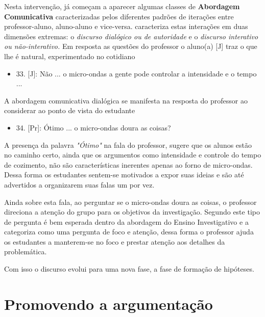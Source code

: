 Nesta intervenção, já começam a aparecer algumas classes de \textbf{Abordagem Comunicativa} caracterizadas pelos diferentes padrões de iterações entre professor-aluno, aluno-aluno e vice-versa. \cite{MORTIMER:2002} caracteriza estas interações em duas dimensões extremas: o \emph{discurso dialógico ou de autoridade} e o \emph{discurso interativo ou não-interativo.}
Em resposta as questões do professor o aluno(a) [J] traz o que lhe é natural, experimentado no cotidiano
\begin{itemize}
    \item 33. [J]: Não ... o micro-ondas a gente pode controlar a intensidade e o tempo ...
\end{itemize}
A abordagem comunicativa dialógica se manifesta na resposta do professor ao considerar ao ponto de vista do estudante
\begin{itemize}
    \item 34. [Pr]: Ótimo ... o micro-ondas doura as coisas?
\end{itemize}
A presença da palavra \emph{"Ótimo"} na fala do professor, sugere que os alunos estão no caminho certo, ainda que os argumentos como intensidade e controle do tempo de cozimento, não são características inerentes apenas ao forno de micro-ondas. Dessa forma os estudantes sentem-se motivados a expor suas ideias e são até advertidos a organizarem suas falas um por vez.

Ainda sobre esta fala, ao perguntar se o micro-ondas doura as coisas, o professor direciona a atenção do grupo para os objetivos da investigação. Segundo \cite{SASSERON:2012} este tipo de pergunta é bem esperada dentro da abordagem do Ensino Investigativo e a categoriza como uma pergunta de foco e atenção, dessa forma o professor ajuda os estudantes a manterem-se no foco e prestar atenção aos detalhes da problemática.   

Com isso o discurso evolui para uma nova fase, a fase de formação de hipóteses.  


\section{Promovendo a argumentação}
\label{sec: analise-habilidades}